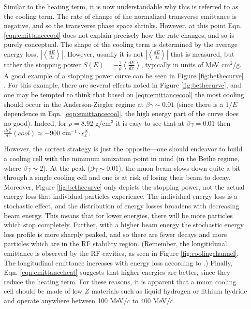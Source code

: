 Similar to the heating term, it is now understandable why this is referred to as the cooling term. The rate of change of the normalized transverse emittance is negative, and so the transverse phase space shrinks. However, at this point Eqn. \ref{eqn:emittancecool} does not explain precisely how the rate changes, and so is purely conceptual. The shape of the cooling term is determined by the average energy loss, $\left|\left<\frac{dE}{dz}\right>\right|$. However, usually it is not $\left|\left<\frac{dE}{dz}\right>\right|$ that is measured, but rather the stopping power $S(E)=-\frac{1}{\rho}\left<\frac{dE}{dx}\right>$, typically in units of MeV cm$^2$/g. A good example of a stopping power curve can be seen in Figure \ref{fig:bethecurve} \cite{PDG}. For this example, there are several effects noted in Figure \ref{fig:bethecurve}, and one may be tempted to think that based on \ref{eqn:emittancecool} the most cooling should occur in the Anderson-Ziegler regime at $\beta\gamma\sim0.01$ (since there is a $1/E$ dependence in Eqn. \ref{eqn:emittancecool}, the high energy part of the curve does no good). Indeed, for $\rho= 8.92$ g/cm$^3$ it is easy to see that at $\beta\gamma=0.01$ then $\frac{d\epsilon_x^N}{dz}(cool)\approx-900$  cm$^{-1} \cdot \epsilon_x^N.$

However, the correct strategy is just the opposite---one should endeavor to build a cooling cell with the minimum ionization point in mind (in the Bethe regime, where $\beta\gamma\sim2$). At the peak ($\beta\gamma\sim0.01$), the muon beam slows down quite a bit through a single cooling cell and one is at risk of losing their beam to decay. Moreover, Figure \ref{fig:bethecurve} only depicts the stopping power, not the actual energy loss that individual particles experience. The individual energy loss is a stochastic effect, and the distribution of energy losses broadens with decreasing beam energy. This means that for lower energies, there will be more particles which stop completely. Further, with a higher beam energy the stochastic energy loss profile is more sharply peaked, and so there are fewer decays and more particles which are in the RF stability region. (Remember, the longitidunal emittance is observed by the RF cavities, as seen in Figure \ref{fig:coolingchannel}. The longitudinal emittance increases with energy loss according to \cite{Fernow}.) Finally, Eqn. \ref{eqn:emittanceheat} suggests that higher energies are better, since they reduce the heating term. For these reasons, it is apparent that a muon cooling cell should be made of low $Z$ materials such as liquid hydrogen or lithium hydride and operate anywhere between 100 MeV/$c$ to 400 MeV$/c$.

